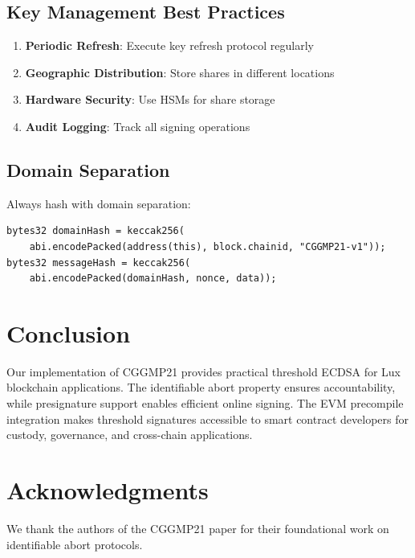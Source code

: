 \documentclass[11pt,a4paper]{article}
\theoremstyle{definition}
\begin{document}
\subsection{Key Management Best Practices}

\begin{enumerate}
\item \textbf{Periodic Refresh}: Execute key refresh protocol regularly
\item \textbf{Geographic Distribution}: Store shares in different locations
\item \textbf{Hardware Security}: Use HSMs for share storage
\item \textbf{Audit Logging}: Track all signing operations
\end{enumerate}

\subsection{Domain Separation}

Always hash with domain separation:

\begin{lstlisting}[language=Solidity]
bytes32 domainHash = keccak256(
    abi.encodePacked(address(this), block.chainid, "CGGMP21-v1"));
bytes32 messageHash = keccak256(
    abi.encodePacked(domainHash, nonce, data));
\end{lstlisting}

\section{Conclusion}

Our implementation of CGGMP21 provides practical threshold ECDSA for Lux blockchain applications. The identifiable abort property ensures accountability, while presignature support enables efficient online signing. The EVM precompile integration makes threshold signatures accessible to smart contract developers for custody, governance, and cross-chain applications.

\section*{Acknowledgments}

We thank the authors of the CGGMP21 paper for their foundational work on identifiable abort protocols.
\end{document}
